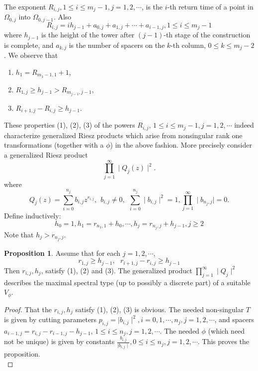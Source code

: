\documentclass{amsart}
\theoremstyle{definition}
\newtheorem{Prop}[Th]{Proposition}
\theoremstyle{remark}
\numberwithin{equation}{section}
\newcommand{\1}{\mathbb{1}}
\begin{document}
 The exponent $R_{i,j}, 1 \leq i \leq m_j-1, j =1,2,\cdots$, is the
$i$-th return time of a point in $\Omega_{0,j}$ into $\Omega_{0,j-1}$. Also
$$R_{i,j} = ih_{j-1} + a_{0,j} + a_{1,j} + \cdots +a_{i-1,j}, 1 \leq i \leq m_{j}-1$$
where $h_{j-1}$ is the height of the tower after $(j-1)$-th stage of the construction is complete, and $a_{k,j}$ is the number of spacers on the $k$-th column, $ 0 \leq k\leq m_j-2$.
We observe that\\
\begin{enumerate}
\item  $h_1 = R_{m_{1}-1,1} +1$,\\
\item  $R_{1,j} \geq h_{j-1} > R_{m_{j-1},j-1}$,\\
\item   $R_{i+1, j} - R_{i,j} \geq h_{j-1}$. \\
\end{enumerate}
  These properties (1), (2), (3) of the powers $R_{i,j}$, $1 \leq i \leq m_j -1, j=1,2,\cdots$ indeed characterize generalized Riesz products which arise from nonsingular rank one transformations (together with a $\phi$) in the above fashion. More precisely consider a generalized Riesz product
$$\prod_{j=1}^\infty\mid Q_j(z)\mid^2. $$
where $$Q_j(z) = \sum_{i=0}^{n_j} b_{i,j}z^{r_{i,j}},~~ b_{i,j} \neq  0, ~~\sum_{i=0}^{n_j}\mid b_{i,j}\mid^2 =1, \prod_{j=1}^\infty \mid b_{n_j,j}\mid =0.$$
Define inductively: $$h_0 = 1, h_1 = r_{n_1,1} +h_0, \cdots , h_j = r_{n_j,j} +h_{j-1}, j \geq 2$$
Note that $ h_j > r_{n_j,j}$.\\

\begin{Prop}\label{prop1}
 Assume that for each $j=1,2,\cdots$,
$$r_{1,j} \geq h_{j-1}, ~~~r_{i+1,j} - r_{i,j} \geq h_{j-1}$$
Then $r_{i,j}, h_j$, satisfy (1), (2) and (3). The generalized product $\prod_{j=1}^\infty \mid Q_j\mid^2$ describes the maximal spectral type (up to possibly a discrete part) of a suitable $V_\phi$.
\end{Prop}
\begin{proof}
 That the $r_{i,j}, h_j$ satisfy (1), (2), (3) is obvious. The needed non-singular $T$ is given by cutting parameters $ p_{i,j} =\mid b_{i,j}\mid^2, i= 0, 1, \cdots, n_j, j = 1,2,\cdots$, and spacers $a_{i-1,j} = r_{i,j} - r_{i-1,j}- h_{j-1}$, $1 \leq i \leq n_j, j =1,2,\cdots$. The needed $\phi$ (which need not be unique) is given by constants $\frac{b_{i,j}}{\mid b_{i,j}\mid}, 0\leq i \leq n_j, j =1,2,\cdots$. This proves the proposition.\\
\end{proof}
\end{document}
